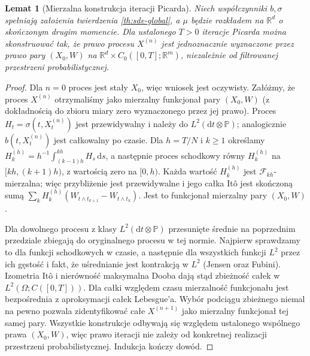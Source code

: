 \documentclass[11pt,a4paper,oneside]{report}
\numberwithin{equation}{chapter}
\theoremstyle{plain}
\newtheorem{lemat}[twierdzenie]{Lemat}
\theoremstyle{definition}
\theoremstyle{remark}
\newcommand{\R}{\mathbb{R}}
\newcommand{\Prob}{\mathbb{P}}
\newcommand{\calF}{\mathcal{F}}
\newcommand{\dd}{\mathrm{d}}
\begin{document}
\begin{lemat}[Mierzalna konstrukcja iteracji Picarda]
\label{lem:picard-measurable}
Niech współczynniki $b,\sigma$ spełniają założenia
twierdzenia \ref{th:sde-global}, a $\mu$ będzie rozkładem
na $\R^d$ o skończonym drugim momencie.
Dla ustalonego $T>0$ iteracje Picarda można skonstruować
tak, że prawo procesu $X^{(n)}$ jest jednoznacznie
wyznaczone przez prawo pary $(X_0,W)$ na
$\R^d\times C_0([0,T];\R^m)$, niezależnie od
filtrowanej przestrzeni probabilistycznej.
\end{lemat}
\begin{proof}
Dla $n=0$ proces jest stały $X_0$, więc wniosek jest oczywisty.
Załóżmy, że proces $X^{(n)}$ otrzymaliśmy jako mierzalny
funkcjonał pary $(X_0,W)$ (z dokładnością do zbioru miary
zero wyznaczonego przez jej prawo). Proces
$H_t=\sigma(t,X_t^{(n)})$ jest przewidywalny i należy
do $L^2(\dd t\otimes\Prob)$; analogicznie
$b(t,X_t^{(n)})$ jest całkowalny po czasie.
Dla $h=T/N$ i $k\ge1$ określamy
$H_k^{(h)}=h^{-1}\int_{(k-1)h}^{kh}H_s\,\dd s$,
a następnie proces schodkowy równy $H_k^{(h)}$
na $[kh,(k+1)h)$, z wartością zero na $[0,h)$.
Każda wartość $H_k^{(h)}$ jest $\calF_{kh}$-mierzalna;
więc przybliżenie jest przewidywalne i jego całka
Itô jest skończoną sumą
$\sum_k H_k^{(h)}(W_{t\wedge t_{k+1}}-W_{t\wedge t_k})$.
Jest to funkcjonał mierzalny pary $(X_0,W)$.

Dla dowolnego procesu z klasy $L^2(\dd t\otimes\Prob)$
przesunięte średnie na poprzednim przedziale zbiegają
do oryginalnego procesu w tej normie. Najpierw sprawdzamy
to dla funkcji schodkowych w czasie, a następnie dla
wszystkich funkcji $L^2$ przez ich gęstość i fakt, że
uśrednianie jest kontrakcją w $L^2$ (Jensen oraz Fubini).
Izometria Itô i nierówność maksymalna Dooba dają stąd
zbieżność całek w $L^2(\Omega;C([0,T]))$.
Dla całki względem czasu mierzalność funkcjonału
jest bezpośrednia z aproksymacji całek Lebesgue'a.
Wybór podciągu zbieżnego niemal na pewno pozwala
zidentyfikować całe $X^{(n+1)}$ jako mierzalny
funkcjonał tej samej pary. Wszystkie konstrukcje
odbywają się względem ustalonego wspólnego prawa
$(X_0,W)$, więc prawo iteracji nie zależy od
konkretnej realizacji przestrzeni probabilistycznej.
Indukcja kończy dowód.
\end{proof}
\end{document}
